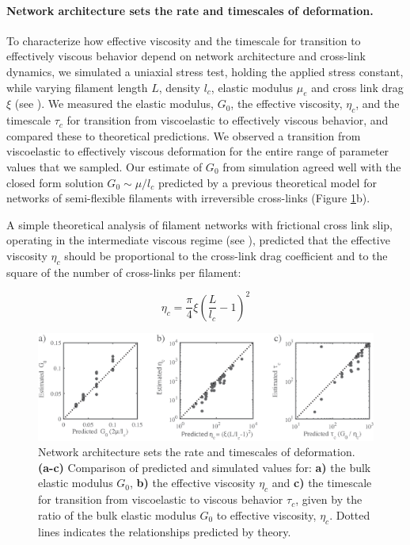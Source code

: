 \documentclass[10pt,letterpaper]{article}
\begin{document}
\paragraph{Network architecture sets the rate and timescales of deformation.}  To characterize how effective viscosity and the timescale for transition to effectively viscous behavior depend on network architecture and cross-link dynamics, we simulated a uniaxial stress test, holding the applied stress constant, while varying filament length $L$, density $l_c$,  elastic modulus $\mu_e$ and cross link drag $\xi$ (see ). We measured the elastic modulus, $G_0$, the effective viscosity, $\eta_c$, and the timescale $\tau_c$ for transition from viscoelastic to effectively viscous behavior, and compared these to theoretical predictions. We observed a transition from viscoelastic to effectively viscous deformation for the entire range of parameter values that we sampled.  Our estimate of $G_0$ from simulation agreed well with the closed form solution  $G_0 \sim \mu/l_c$ predicted by a previous theoretical model \cite{theo_hlm} for networks of semi-flexible filaments with irreversible cross-links (Figure \ref{fig:passive_form}b). 

A simple theoretical analysis of filament networks with frictional cross link slip, operating in the intermediate viscous regime (see ), predicted that the effective viscosity $\eta_c$ should be proportional to the cross-link drag coefficient and to the square of the number of cross-links per filament:

\begin{equation}
\eta_c = \frac{\pi}{4}\xi\left ( \frac{L}{l_c}-1\right )^2
\end{equation}


\begin{figure}[h!]
\centering
\includegraphics[width=\hsize]{figures/figure3}
\caption{\label{fig:passive_form} Network architecture sets the rate and timescales of deformation.  \textbf{(a-c)} Comparison of predicted and simulated values for: \textbf{a)} the bulk elastic modulus $G_0$,  \textbf{b)} the effective viscosity $\eta_c$ and \textbf{c)} the timescale for transition from viscoelastic to viscous behavior $\tau_c$, given by the ratio of the bulk elastic modulus $G_0$ to effective viscosity, $\eta_c$. Dotted lines indicates the relationships predicted by theory. }
\end{figure}
\end{document}
